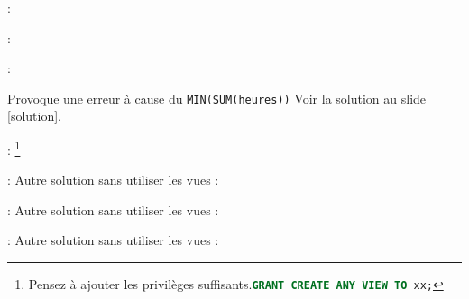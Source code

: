 \documentclass[10pt]{beamer}
\begin{document}
\begin{frame}{\secname : \subsecname}
    
\end{frame}

\begin{frame}{\secname : \subsecname}
    
\end{frame}

\begin{frame}{\secname : \subsecname}
    
    Provoque une erreur à cause du \lstinline[language=xml]!MIN(SUM(heures))! Voir la solution au slide \ref{solution}.
\end{frame}


\begin{frame}{\secname : \subsecname}
    \footnote{Pensez à ajouter les privilèges suffisants.\lstinline[language=sql]!GRANT CREATE ANY VIEW TO xx;!}
\end{frame}

\begin{frame}{\secname : \subsecname}
    Autre solution sans utiliser les vues :
    
\end{frame}

\begin{frame}{\secname : \subsecname}
    Autre solution sans utiliser les vues :
    
\end{frame}

\begin{frame}{\secname : \subsecname}
    Autre solution sans utiliser les vues :
    
\end{frame}
\end{document}
